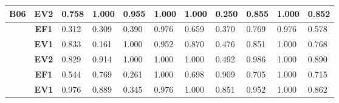 \begin{table}[htbp]
\begin{tabular}{|cclllllllll|}
		\multicolumn{1}{|c|}{\multirow{-3}{*}{\cellcolor[HTML]{F2F2F2}\textbf{B06}}} & \multicolumn{1}{c|}{\textbf{EV2}} & \multicolumn{1}{l|}{0.758} & \multicolumn{1}{l|}{1.000} & \multicolumn{1}{l|}{0.955} & \multicolumn{1}{l|}{1.000} & \multicolumn{1}{l|}{1.000} & \multicolumn{1}{l|}{0.250} & \multicolumn{1}{l|}{0.855} & \multicolumn{1}{l|}{1.000} & 0.852 \\ \hline
		\rowcolor[HTML]{F2F2F2} 
		\multicolumn{1}{|c|}{\cellcolor[HTML]{F2F2F2}} & \multicolumn{1}{c|}{\cellcolor[HTML]{F2F2F2}\textbf{EF1}} & \multicolumn{1}{l|}{\cellcolor[HTML]{F2F2F2}0.312} & \multicolumn{1}{l|}{\cellcolor[HTML]{F2F2F2}0.309} & \multicolumn{1}{l|}{\cellcolor[HTML]{F2F2F2}0.390} & \multicolumn{1}{l|}{\cellcolor[HTML]{F2F2F2}0.976} & \multicolumn{1}{l|}{\cellcolor[HTML]{F2F2F2}0.659} & \multicolumn{1}{l|}{\cellcolor[HTML]{F2F2F2}0.370} & \multicolumn{1}{l|}{\cellcolor[HTML]{F2F2F2}0.769} & \multicolumn{1}{l|}{\cellcolor[HTML]{F2F2F2}0.976} & 0.578 \\ \cline{2-11} 
		\multicolumn{1}{|c|}{\cellcolor[HTML]{F2F2F2}} & \multicolumn{1}{c|}{\textbf{EV1}} & \multicolumn{1}{l|}{0.833} & \multicolumn{1}{l|}{0.161} & \multicolumn{1}{l|}{1.000} & \multicolumn{1}{l|}{0.952} & \multicolumn{1}{l|}{0.870} & \multicolumn{1}{l|}{0.476} & \multicolumn{1}{l|}{0.851} & \multicolumn{1}{l|}{1.000} & 0.768 \\ \cline{2-11} 
		\rowcolor[HTML]{F2F2F2} 
		\multicolumn{1}{|c|}{\multirow{-3}{*}{\cellcolor[HTML]{F2F2F2}\textbf{B08}}} & \multicolumn{1}{c|}{\cellcolor[HTML]{F2F2F2}\textbf{EV2}} & \multicolumn{1}{l|}{\cellcolor[HTML]{F2F2F2}0.829} & \multicolumn{1}{l|}{\cellcolor[HTML]{F2F2F2}0.914} & \multicolumn{1}{l|}{\cellcolor[HTML]{F2F2F2}1.000} & \multicolumn{1}{l|}{\cellcolor[HTML]{F2F2F2}1.000} & \multicolumn{1}{l|}{\cellcolor[HTML]{F2F2F2}1.000} & \multicolumn{1}{l|}{\cellcolor[HTML]{F2F2F2}0.492} & \multicolumn{1}{l|}{\cellcolor[HTML]{F2F2F2}0.986} & \multicolumn{1}{l|}{\cellcolor[HTML]{F2F2F2}1.000} & 0.890 \\ \hline
		\multicolumn{1}{|c|}{\cellcolor[HTML]{F2F2F2}} & \multicolumn{1}{c|}{\textbf{EF1}} & \multicolumn{1}{l|}{0.544} & \multicolumn{1}{l|}{0.769} & \multicolumn{1}{l|}{0.261} & \multicolumn{1}{l|}{1.000} & \multicolumn{1}{l|}{0.698} & \multicolumn{1}{l|}{0.909} & \multicolumn{1}{l|}{0.705} & \multicolumn{1}{l|}{1.000} & 0.715 \\ \cline{2-11} 
		\rowcolor[HTML]{F2F2F2} 
		\multicolumn{1}{|c|}{\cellcolor[HTML]{F2F2F2}} & \multicolumn{1}{c|}{\cellcolor[HTML]{F2F2F2}\textbf{EV1}} & \multicolumn{1}{l|}{\cellcolor[HTML]{F2F2F2}0.976} & \multicolumn{1}{l|}{\cellcolor[HTML]{F2F2F2}0.889} & \multicolumn{1}{l|}{\cellcolor[HTML]{F2F2F2}0.345} & \multicolumn{1}{l|}{\cellcolor[HTML]{F2F2F2}0.976} & \multicolumn{1}{l|}{\cellcolor[HTML]{F2F2F2}1.000} & \multicolumn{1}{l|}{\cellcolor[HTML]{F2F2F2}0.851} & \multicolumn{1}{l|}{\cellcolor[HTML]{F2F2F2}0.952} & \multicolumn{1}{l|}{\cellcolor[HTML]{F2F2F2}1.000} & 0.862 \\ \cline{2-11} 

\end{tabular}
\end{table}

